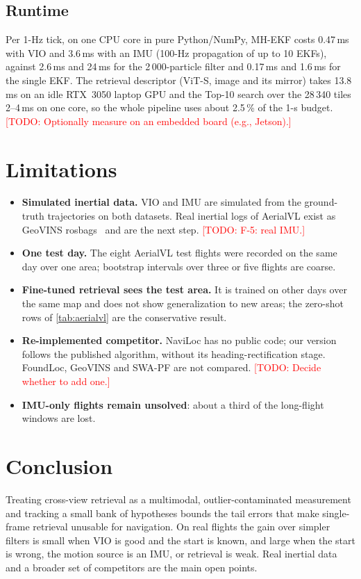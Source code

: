\documentclass[journal]{IEEEtran}
\newcommand{\todo}[1]{\textcolor{red}{[TODO: #1]}}
\begin{document}
\subsection{Runtime}
Per 1-Hz tick, on one CPU core in pure Python/NumPy, MH-EKF costs 0.47\,ms with VIO and 3.6\,ms with an IMU (100-Hz propagation of up to 10 EKFs), against 2.6\,ms and 24\,ms for the 2\,000-particle filter and 0.17\,ms and 1.6\,ms for the single EKF. The retrieval descriptor (ViT-S, image and its mirror) takes 13.8\,ms on an idle RTX~3050 laptop GPU and the Top-10 search over the 28\,340 tiles 2--4\,ms on one core, so the whole pipeline uses about 2.5\,\% of the 1-s budget. \todo{Optionally measure on an embedded board (e.g., Jetson).}

\section{Limitations}
\begin{itemize}
  \item \textbf{Simulated inertial data.} VIO and IMU are simulated from the ground-truth trajectories on both datasets.
  Real inertial logs of AerialVL exist as GeoVINS rosbags~\cite{li2025geovins} and are the next step. \todo{F-5: real IMU.}
  \item \textbf{One test day.} The eight AerialVL test flights were recorded on the same day over one area; bootstrap
  intervals over three or five flights are coarse.
  \item \textbf{Fine-tuned retrieval sees the test area.} It is trained on other days over the same map and does not
  show generalization to new areas; the zero-shot rows of \cref{tab:aerialvl} are the conservative result.
  \item \textbf{Re-implemented competitor.} NaviLoc has no public code; our version follows the published algorithm,
  without its heading-rectification stage. FoundLoc, GeoVINS and SWA-PF are not compared. \todo{Decide whether to add one.}
  \item \textbf{IMU-only flights remain unsolved}: about a third of the long-flight windows are lost.
\end{itemize}

\section{Conclusion}
Treating cross-view retrieval as a multimodal, outlier-contaminated measurement and tracking a small bank of hypotheses
bounds the tail errors that make single-frame retrieval unusable for navigation. On real flights the gain over simpler
filters is small when VIO is good and the start is known, and large when the start is wrong, the motion source is an
IMU, or retrieval is weak. Real inertial data and a broader set of competitors are the main open points.



\end{document}
